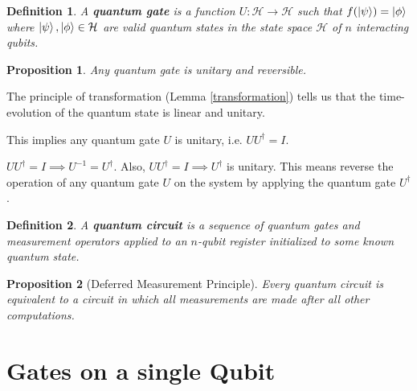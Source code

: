 \documentclass[12pt,twoside,fleqn]{report}
\makeatletter
\theoremstyle{thmstyle}
\renewenvironment{proof}[1][\proofname]{\par
\pushQED{\qed}%
\normalfont \topsep6\p@\@plus6\p@\relax
\trivlist
\item[\hskip\labelsep\itshape#1\@addpunct{.}]\mbox{}\par\nobreak\ignorespaces
}{%
    \popQED\endtrivlist\@endpefalse
    }
\newtheorem{defn}{Definition}[chapter]
\newtheorem{prop}{Proposition}[chapter]
\makeatother
\begin{document}
\begin{comment}
     x Definitition of quantum gates
     x Gates are unitary
     x reversible defn
     x Gates are reversible
     x quantum circuit definition
     * Quantum Gates applied to one qubit in an $n$-qubit register
     * deferred measurement principle
     * ket bra notation and how it describes a transformation
     x any reversible classical gate has a valid quantum analog
     x Quantum gates have an equal number of inputs and outputs?
     * Single Qubit Gates
     * Eigen values and Eigenvectors of Hadamard Gate
     * Multiple Qubit Gates
     * Proof that each gate described is unitary
\end{comment}


\begin{defn}
    A \textbf{quantum gate} is a function $U: \mathcal{H} \to \mathcal{H}$ such that $f(\ket\psi) = \ket\phi$ where $\ket\psi, \ket\phi \in \mathcal{H}$ are valid quantum states in the state space $\mathcal{H}$ of $n$ interacting qubits.
\end{defn}

\begin{prop}
    Any quantum gate is unitary and reversible.
\end{prop}
\begin{proof}
    The principle of transformation (Lemma \ref{transformation}) tells us that the time-evolution of the quantum state is linear and unitary. 

    This implies any quantum gate $U$ is unitary, i.e. $U U^{\dagger} = I$. 

    $U U^\dagger = I \implies U^{-1} = U^\dagger$.
    Also, $ U U^\dagger = I \implies U^\dagger$ is unitary.  
    This means reverse the operation of any quantum gate $U$ on the system by applying the quantum gate $U^\dagger$.
\end{proof}

\begin{defn}
    A \textbf{quantum circuit} is a sequence of quantum gates and measurement operators applied to an $n$-qubit register initialized to some known quantum state.
\end{defn}

\begin{prop}[Deferred Measurement Principle]
    Every quantum circuit is equivalent to a circuit in which all measurements are made after all other computations.
\end{prop}


\section{Gates on a single Qubit}
\end{document}
